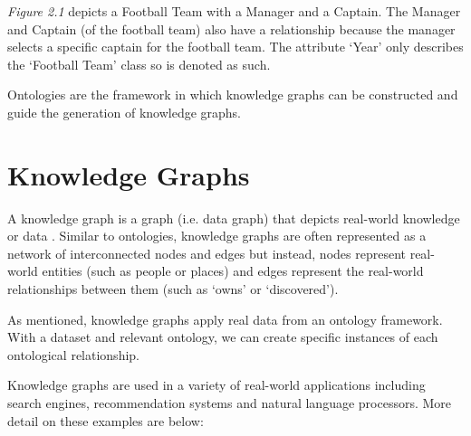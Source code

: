 \textit{Figure 2.1} depicts a Football Team with a Manager and a Captain. The Manager and Captain (of the football team) also have a relationship because the manager selects a specific captain for the football team. The attribute `Year' only describes the `Football Team' class so is denoted as such.

Ontologies are the framework in which knowledge graphs can be constructed and guide the generation of knowledge graphs. 

\section{Knowledge Graphs}
\hspace{0.5cm} A knowledge graph is a graph (i.e. data graph) that depicts real-world knowledge or data \cite{knowledgegraph}. Similar to ontologies, knowledge graphs are often represented as a network of interconnected nodes and edges but instead, nodes represent real-world entities (such as people or places) and edges represent the real-world relationships between them (such as `owns' or `discovered'). 

As mentioned, knowledge graphs apply real data from an ontology framework. With a dataset and relevant ontology, we can create specific instances of each ontological relationship. 

Knowledge graphs are used in a variety of real-world applications including search engines, recommendation systems and natural language processors. More detail on these examples are below:

